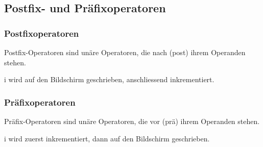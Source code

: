 	\begin{minipage}[t]{9 cm}	
		\subsection{Postfix- und Präfixoperatoren}
			\subsubsection{Postfixoperatoren}
				Postfix-Operatoren sind unäre Operatoren, die nach (post) ihrem Operanden stehen.
				\vspace*{-0.2cm}
				
				i wird auf den Bildschirm geschrieben, anschliessend inkrementiert.
	\end{minipage}
	\hspace*{1cm}		
	\begin{minipage}[t]{9 cm}
			\subsubsection{Präfixoperatoren}
				Präfix-Operatoren sind unäre Operatoren, die vor (prä) ihrem Operanden stehen.
				\vspace*{-0.2cm}
				
				i wird zuerst inkrementiert, dann auf den Bildschirm geschrieben.
		\end{minipage}

